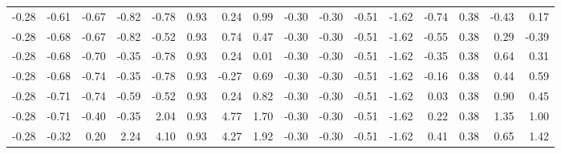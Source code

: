 \documentclass[]{interact}
\theoremstyle{plain}%
\theoremstyle{definition}
\theoremstyle{remark}
\begin{document}
\begin{table}[H]
{\begin{tabularx}{1.3\columnwidth}{ *{16}{R} }
-0.28 & -0.61 & -0.67 & -0.82 & -0.78 & 0.93 & 0.24 & 0.99 & -0.30 & -0.30 & -0.51 & -1.62 & -0.74 & 0.38 & -0.43 & 0.17\\
-0.28 & -0.68 & -0.67 & -0.82 & -0.52 & 0.93 & 0.74 & 0.47 & -0.30 & -0.30 & -0.51 & -1.62 & -0.55 & 0.38 & 0.29 & -0.39\\
-0.28 & -0.68 & -0.70 & -0.35 & -0.78 & 0.93 & 0.24 & 0.01 & -0.30 & -0.30 & -0.51 & -1.62 & -0.35 & 0.38 & 0.64 & 0.31\\
-0.28 & -0.68 & -0.74 & -0.35 & -0.78 & 0.93 & -0.27 & 0.69 & -0.30 & -0.30 & -0.51 & -1.62 & -0.16 & 0.38 & 0.44 & 0.59\\
-0.28 & -0.71 & -0.74 & -0.59 & -0.52 & 0.93 & 0.24 & 0.82 & -0.30 & -0.30 & -0.51 & -1.62 & 0.03 & 0.38 & 0.90 & 0.45\\
-0.28 & -0.71 & -0.40 & -0.35 & 2.04 & 0.93 & 4.77 & 1.70 & -0.30 & -0.30 & -0.51 & -1.62 & 0.22 & 0.38 & 1.35 & 1.00\\
-0.28 & -0.32 & 0.20 & 2.24 & 4.10 & 0.93 & 4.27 & 1.92 & -0.30 & -0.30 & -0.51 & -1.62 & 0.41 & 0.38 & 0.65 & 1.42\\
\bottomrule
\end{tabularx}}
\label{table:InputMatrix}
\end{table}
\end{document}
